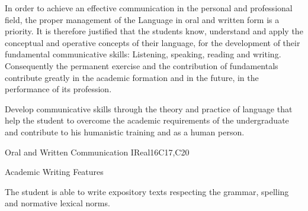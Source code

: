 \begin{syllabus}


\begin{justification}
In order to achieve an effective communication in the personal and professional field, the proper management of the Language in oral and written form is a priority. It is therefore justified that the students know, understand and apply the conceptual and operative concepts of their language, for the development of their fundamental communicative skills: Listening, speaking, reading and writing.
Consequently the permanent exercise and the contribution of fundamentals contribute greatly in the academic formation and in the future, in the performance of its profession.
\end{justification}

\begin{goals}
\item Develop communicative skills through the theory and practice of language that help the student to overcome the academic requirements of the undergraduate and contribute to his humanistic training and as a human person.
\end{goals}

\begin{outcomes}
   \item {}
   \item {}
   \item {}
\end{outcomes}

\begin{competences}
    \item {}
    \item {}
    \item {}
\end{competences}

\begin{unit}{Oral and Written Communication I}{}{Real}{16}{C17,C20}
\begin{topics}
      \item Academic Writing Features
\end{topics}

\begin{learningoutcomes}
   \item The student is able to write expository texts respecting the grammar, spelling and normative lexical norms.
\end{learningoutcomes}
\end{unit}

\begin{coursebibliography}
\end{coursebibliography}

\end{syllabus}
